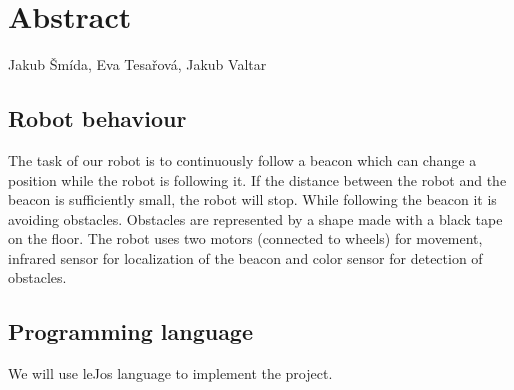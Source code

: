 \documentclass{article}
\begin{document}
\section*{\hfil Abstract \hfil}

\begin{center}
Jakub Šmída, Eva Tesařová, Jakub Valtar
\end{center}

\subsection*{Robot behaviour}
The task of our robot is to continuously follow a beacon which can change a position while the robot is following it. If the distance between the robot and the beacon is sufficiently small, the robot will stop. While following the beacon it is avoiding obstacles. Obstacles are represented by a shape made with a black tape on the floor. The robot uses two motors (connected to wheels) for movement, infrared sensor for localization of the beacon and color sensor for detection of obstacles.   

\subsection*{Programming language}
We will use leJos language to implement the project.
\end{document}
